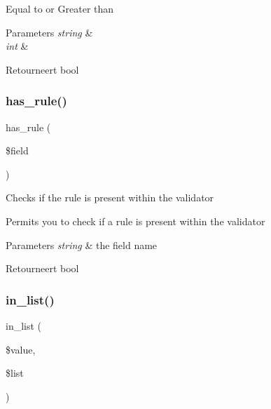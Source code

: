 Equal to or Greater than


\begin{DoxyParams}{Parameters}
{\em string} & \\
\hline
{\em int} & \\
\hline
\end{DoxyParams}
\begin{DoxyReturn}{Retourneert}
bool 
\end{DoxyReturn}
\mbox{\label{class_c_i___form__validation_aaf0ef71d3e9ac390f52441f27e4b7786}} 
\subsubsection{\texorpdfstring{has\_rule()}{has\_rule()}}
{\footnotesize\ttfamily has\+\_\+rule (\begin{DoxyParamCaption}\item[{}]{\$field }\end{DoxyParamCaption})}

Checks if the rule is present within the validator

Permits you to check if a rule is present within the validator


\begin{DoxyParams}{Parameters}
{\em string} & the field name \\
\hline
\end{DoxyParams}
\begin{DoxyReturn}{Retourneert}
bool 
\end{DoxyReturn}
\mbox{\label{class_c_i___form__validation_a27365f05674ed5c959747000113f29aa}} 
\subsubsection{\texorpdfstring{in\_list()}{in\_list()}}
{\footnotesize\ttfamily in\+\_\+list (\begin{DoxyParamCaption}\item[{}]{\$value,  }\item[{}]{\$list }\end{DoxyParamCaption})}

